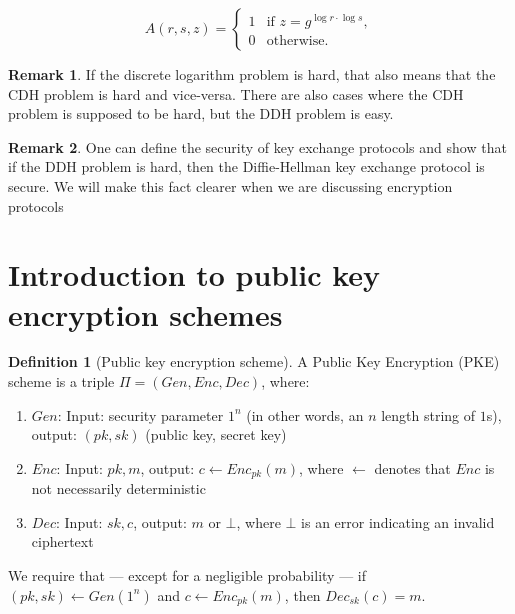\documentclass[11pt]{article}
\theoremstyle{definition}
\newtheorem{definition}{Definition}[section]
\newtheorem{remark}{Remark}[section]
\theoremstyle{proof}
\begin{document}
$$
A(r, s, z) =
\begin{cases}
	1 & \text{if } z = g^{\log r \cdot \log s}, \\
	0 & \text{otherwise}.
\end{cases}
$$

\begin{remark}
	If the discrete logarithm problem is hard, that also means that the CDH problem is hard and vice-versa. There are also cases where the CDH problem is supposed to be hard, but the DDH problem is easy.
\end{remark}

\begin{remark}
	One can define the security of key exchange protocols and show that if the DDH problem is hard, then the Diffie-Hellman key exchange protocol is secure. We will make this fact clearer when we are discussing encryption protocols
\end{remark}

\section{Introduction to public key encryption schemes}

\begin{definition}[Public key encryption scheme]
	\item A Public Key Encryption (PKE) scheme is a triple $\Pi = (Gen, Enc, Dec)$, where:
	\begin{enumerate}
		\item $Gen$: Input: security parameter $1^n$ (in other words, an $n$ length string of $1$s), output: $(pk, sk)$ (public key, secret key)
		\item $Enc$: Input: $pk, m$, output: $c \leftarrow Enc_{pk}(m)$, where $\leftarrow$ denotes that $Enc$ is not necessarily deterministic
		\item $Dec$: Input: $sk, c$, output: $m$ or $\bot$, where $\bot$ is an error indicating an invalid ciphertext
	\end{enumerate}
\end{definition}

We require that --- except for a negligible probability --- if $(pk, sk) \leftarrow Gen(1^n)$ and $c \leftarrow Enc_{pk}(m)$, then $Dec_{sk}(c) = m$.
\end{document}
